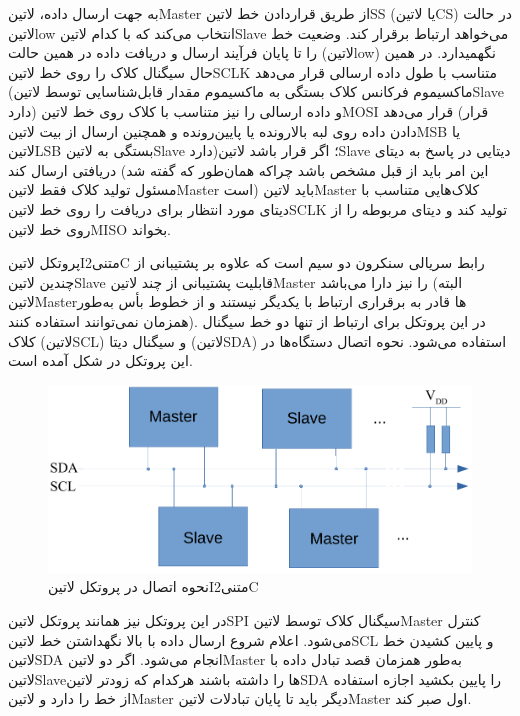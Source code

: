 به جهت ارسال داده، ‌لاتین{Master} از طریق قراردادن خط ‌لاتین{SS} (یا ‌لاتین{CS}) در حالت ‌لاتین{low} انتخاب می‌کند که با کدام ‌لاتین{Slave} می‌خواهد ارتباط برقرار کند. وضعیت خط را تا پایان فرآیند ارسال و دریافت داده در همین حالت (‌لاتین{low}) نگهمیدارد. در همین حال سیگنال کلاک را روی خط ‌لاتین{SCLK} متناسب با طول داده ارسالی قرار می‌دهد (ماکسیموم فرکانس کلاک بستگی به ماکسیموم مقدار قابل‌شناسایی توسط ‌لاتین{Slave} دارد) و داده ارسالی را نیز متناسب با کلاک روی خط ‌لاتین{MOSI} قرار می‌دهد (قرار دادن داده روی لبه بالارونده یا پایین‌رونده و همچنین ارسال از بیت ‌لاتین{MSB} یا ‌لاتین{LSB} بستگی به ‌لاتین{Slave} دارد)؛ اگر قرار باشد ‌لاتین{Slave} دیتایی در پاسخ به دیتای دریافتی ارسال کند (این امر باید از قبل مشخص باشد چراکه همان‌طور که گفته شد مسئول تولید کلاک فقط ‌لاتین{Master} است) باید ‌لاتین{Master} کلاک‌‌هایی متناسب با دیتای مورد انتظار برای دریافت را روی خط ‌لاتین{SCLK} تولید کند و دیتای مربوطه را از روی خط ‌لاتین{MISO} بخواند.


پروتکل ‌لاتین{I‌متنی{2}C} رابط سریالی سنکرون دو سیم است که علاوه بر پشتیبانی از چندین ‌لاتین{Slave} قابلیت پشتیبانی از چند ‌لاتین{Master} را نیز دارا می‌باشد (البته ‌لاتین{Master}ها قادر به برقراری ارتباط با یکدیگر نیستند و از خطوط بأس به‌طور همزمان نمی‌توانند استفاده کنند). در این پروتکل برای ارتباط از تنها دو خط سیگنال کلاک (‌لاتین{SCL}) و سیگنال دیتا (‌لاتین{SDA}) استفاده می‌شود. نحوه اتصال دستگاه‌ها در این پروتکل در شکل  آمده است.

\begin{figure}[!h]
	\centering
	\includegraphics[width=.7\linewidth]{Assets/I2C.pdf}
	\caption{نحوه اتصال در پروتکل ‌لاتین{{I‌متنی{2}C}}}
	\label{fig:I2CWiring}
\end{figure}

در این پروتکل نیز همانند پروتکل ‌لاتین{SPI} سیگنال کلاک توسط ‌لاتین{Master} کنترل می‌شود. اعلام شروع ارسال داده با بالا نگهداشتن خط ‌لاتین{SCL} و پایین کشیدن خط ‌لاتین{SDA} انجام می‌شود. اگر دو ‌لاتین{Master} به‌طور همزمان قصد تبادل داده با ‌لاتین{Slave}ها را داشته باشند هرکدام که زودتر ‌لاتین{SDA} را پایین بکشید اجازه استفاده از خط را دارد و ‌لاتین{Master} دیگر باید تا پایان تبادلات ‌لاتین{Master} اول صبر کند.

